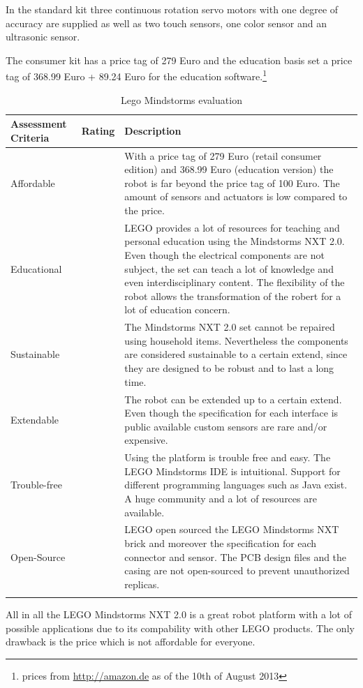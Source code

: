 In the standard kit three continuous rotation servo motors with one degree of accuracy are supplied as well as two touch sensors, one color sensor and an ultrasonic sensor. 

The consumer kit has a price tag of 279 Euro and the education basis set a price tag of 368.99 Euro + 89.24 Euro for the education software.\footnote{prices from \url{http://amazon.de} as of the 10th of August 2013}

\begin{longtabu} to \textwidth { X[1,l] X[1,l] X[4,l]}
\toprule
Assessment Criteria    & Rating & Description \\
\midrule
Affordable  &     & With a price tag of 279 Euro (retail consumer edition) and 368.99 Euro (education version) the robot is far beyond the price tag of 100 Euro. The amount of sensors and actuators is low compared to the price.\\
Educational &      & LEGO provides a lot of resources for teaching and personal education using the Mindstorms NXT 2.0. Even though the electrical components are not subject, the set can teach a lot of knowledge and even interdisciplinary content. The flexibility of the robot allows the transformation of the robert for a lot of education concern. \\
Sustainable  &      & The Mindstorms NXT 2.0 set cannot be repaired using household items. Nevertheless the components are considered sustainable to a certain extend, since they are designed to be robust and to last a long time.\\
Extendable &  & The robot can be extended up to a certain extend. Even though the specification for each interface is public available custom sensors are rare and/or expensive. \\
Trouble-free &  & Using the platform is trouble free and easy. The LEGO Mindstorms IDE is intuitional. Support for different programming languages such as Java exist. A huge community and a lot of resources are available.\\
Open-Source &  & LEGO open sourced the LEGO Mindstorms NXT brick and moreover the specification for each connector and sensor. The PCB design files and the casing are not open-sourced to prevent unauthorized replicas.\\
\bottomrule
\caption{Lego Mindstorms evaluation}
\label{tbl:mindstorms_eval}
\end{longtabu}

All in all the LEGO Mindstorms NXT 2.0 is a great robot platform with a lot of possible applications due to its compability with other LEGO products. The only drawback is the price which is not affordable for everyone.

